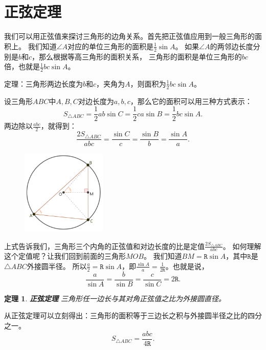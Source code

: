 \documentclass[12pt,UTF8]{ctexbook}
\newtheorem{tm}{定理}[section]
\begin{document}
\section{正弦定理}

我们可以用正弦值来探讨三角形的边角关系。首先把正弦值应用到一般三角形的面积上。
我们知道$\angle A$对应的单位三角形的面积是$\frac{1}{2}\sin A$。
如果$\angle A$的两邻边长度分别是$b$和$c$，那么根据等高三角形的面积关系，
三角形的面积是单位三角形的$bc$倍，也就是$\frac{1}{2}bc\sin A$。

定理：三角形两边长度为$b$和$c$，夹角为$A$，则面积为$\frac{1}{2}bc\sin A$。

设三角形$ABC$中$A,B,C$对边长度为$a,b,c$，那么它的面积可以用三种方式表示：
$$ S_{\triangle ABC} = \frac{1}{2}ab\sin C = \frac{1}{2}ca\sin B = \frac{1}{2}bc\sin A.$$
两边除以$\frac{abc}{2}$，就得到：
$$  \frac{2S_{\triangle ABC}}{abc} = \frac{\sin C}{c} = \frac{\sin B}{b} = \frac{\sin A}{a}. $$

\begin{figure} %
    \vspace{-30pt}
    \flushright
    \includegraphics[width=0.36\textwidth]{tu/三角函数1.png}
\end{figure}

上式告诉我们，三角形三个内角的正弦值和对边长度的比是定值$\frac{2S_{\triangle ABC}}{abc}$。
如何理解这个定值呢？让我们回到前面的三角形$MOB$。
我们知道$BM = \mathtt{R}\sin A$，其中$\mathtt{R}$是$\triangle ABC$外接圆半径。
所以$ \frac{a}{2} = \mathtt{R}\sin A$，即$ \frac{\sin A}{a} = \frac{1}{2\mathtt{R}}$。也就是说，
$$ \frac{a}{\sin A} = \frac{b}{\sin B} = \frac{c}{\sin C} =  2\mathtt{R}. $$

\begin{tm}{\textbf{正弦定理} }\label{tm:2-1-10}
    三角形任一边长与其对角正弦值之比为外接圆直径。
\end{tm}
从正弦定理可以立刻得出：三角形的面积等于三边长之积与外接圆半径之比的四分之一。
$$S_{\triangle ABC} = \frac{abc}{4\mathtt{R}}. $$ 
\end{document}
